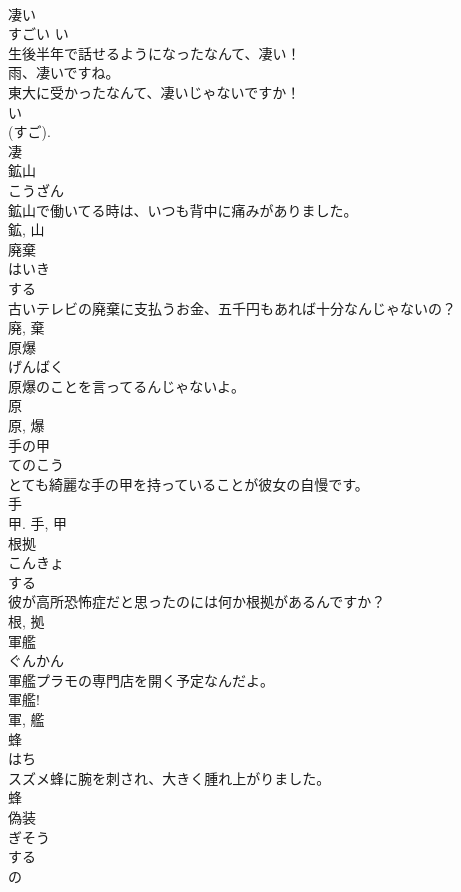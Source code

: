 \documentclass[8pt]{extreport}
\begin{document}
\begin{CJK}{UTF8}{min}
\\	凄い	
\\	すごい	い 
\\	生後半年で話せるようになったなんて、凄い！	
\\	雨、凄いですね。	
\\	東大に受かったなんて、凄いじゃないですか！	
\\	い 
\\	(すご). 
\\	凄	
\\	鉱山	
\\	こうざん	
\\	鉱山で働いてる時は、いつも背中に痛みがありました。	
\\	鉱, 山	
\\	廃棄	
\\	はいき	
\\	する 
\\	古いテレビの廃棄に支払うお金、五千円もあれば十分なんじゃないの？	
\\	廃, 棄	
\\	原爆	
\\	げんばく	
\\	原爆のことを言ってるんじゃないよ。	
\\	原 
\\	原, 爆	
\\	手の甲	
\\	てのこう	
\\	とても綺麗な手の甲を持っていることが彼女の自慢です。	
\\	手 
\\	甲.	手, 甲	
\\	根拠	
\\	こんきょ	
\\	する 
\\	彼が高所恐怖症だと思ったのには何か根拠があるんですか？	
\\	根, 拠	
\\	軍艦	
\\	ぐんかん	
\\	軍艦プラモの専門店を開く予定なんだよ。	
\\	軍艦!	
\\	軍, 艦	
\\	蜂	
\\	はち	
\\	スズメ蜂に腕を刺され、大きく腫れ上がりました。	
\\	蜂	
\\	偽装	
\\	ぎそう	
\\	する 
\\	の 

\end{CJK}
\end{document}
